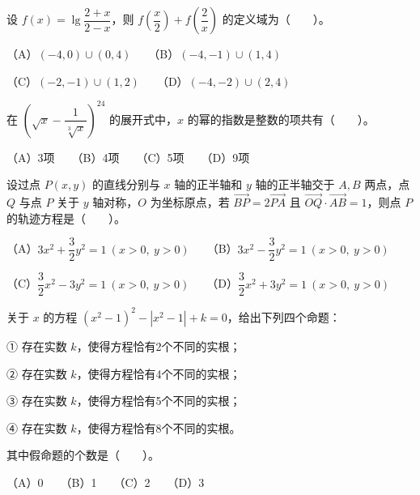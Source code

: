 \begin{question}
设 $f(x)=\lg\dfrac{2+x}{2-x}$，则 $f\left(\dfrac{x}{2}\right)+f\left(\dfrac{2}{x}\right)$ 的定义域为\mbox{（　　）}。

（A）$(-4,0)\cup(0,4)$　　（B）$(-4,-1)\cup(1,4)$

（C）$(-2,-1)\cup(1,2)$　　（D）$(-4,-2)\cup(2,4)$

\end{question}
\begin{question}
在 $\left(\sqrt{x}-\dfrac{1}{\sqrt[3]{x}}\right)^{24}$ 的展开式中，$x$ 的幂的指数是整数的项共有\mbox{（　　）}。

（A）3项　　（B）4项　　（C）5项　　（D）9项

\end{question}
\begin{question}
设过点 $P(x,y)$ 的直线分别与 $x$ 轴的正半轴和 $y$ 轴的正半轴交于 $A,B$ 两点，点 $Q$ 与点 $P$ 关于 $y$ 轴对称，$O$ 为坐标原点，若 $\overrightarrow{BP}=2\overrightarrow{PA}$ 且 $\overrightarrow{OQ}\cdot\overrightarrow{AB}=1$，则点 $P$ 的轨迹方程是\mbox{（　　）}。

（A）$3x^2+\dfrac32y^2=1\ (x>0,\ y>0)$　　（B）$3x^2-\dfrac32y^2=1\ (x>0,\ y>0)$

（C）$\dfrac32x^2-3y^2=1\ (x>0,\ y>0)$　　（D）$\dfrac32x^2+3y^2=1\ (x>0,\ y>0)$

\end{question}
\begin{question}
关于 $x$ 的方程 $(x^2-1)^2-|x^2-1|+k=0$，给出下列四个命题：

① 存在实数 $k$，使得方程恰有2个不同的实根；

② 存在实数 $k$，使得方程恰有4个不同的实根；

③ 存在实数 $k$，使得方程恰有5个不同的实根；

④ 存在实数 $k$，使得方程恰有8个不同的实根。

其中假命题的个数是\mbox{（　　）}。

（A）0　　（B）1　　（C）2　　（D）3

\end{question}

